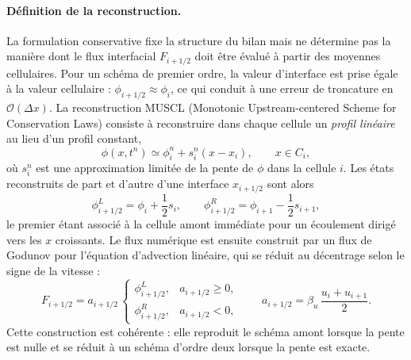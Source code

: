 \documentclass[11pt,a4paper]{report}
\begin{document}
\paragraph{Définition de la reconstruction.} La formulation conservative fixe la structure du bilan mais ne
détermine pas la manière dont le flux interfacial \(F_{i+1/2}\) doit être évalué à partir des moyennes
cellulaires. Pour un schéma de premier ordre, la valeur d'interface est prise égale à la valeur cellulaire :
\(\phi_{i+1/2} \approx \phi_i\), ce qui conduit à une erreur de troncature en \(\mathcal{O}(\Delta x)\).
La reconstruction MUSCL (Monotonic Upstream-centered Scheme for Conservation Laws) consiste à reconstruire
dans chaque cellule un \emph{profil linéaire} au lieu d'un profil constant,
\begin{equation}
\phi(x,t^n) \simeq \phi_i^n + s_i^n\left(x - x_i\right),
\qquad x \in C_i ,
\label{eq:reconstruction-lineaire}
\end{equation}
où \(s_i^n\) est une approximation limitée de la pente de \(\phi\) dans la cellule \(i\). Les états
reconstruits de part et d'autre d'une interface \(x_{i+1/2}\) sont alors
\begin{equation}
\phi_{i+1/2}^{L} = \phi_i + \frac{1}{2}s_i,
\qquad
\phi_{i+1/2}^{R} = \phi_{i+1} - \frac{1}{2}s_{i+1},
\label{eq:etats-interface}
\end{equation}
le premier étant associé à la cellule amont immédiate pour un écoulement dirigé vers les \(x\) croissants.
Le flux numérique est ensuite construit par un flux de Godunov pour l'équation d'advection linéaire, qui
se réduit au décentrage selon le signe de la vitesse :
\begin{equation}
F_{i+1/2} = a_{i+1/2}\,
\begin{cases}
\phi_{i+1/2}^{L}, & a_{i+1/2} \ge 0,\\[1mm]
\phi_{i+1/2}^{R}, & a_{i+1/2} < 0,
\end{cases}
\qquad
a_{i+1/2} = \beta_u\,\frac{u_i + u_{i+1}}{2}.
\label{eq:flux-godunov}
\end{equation}
Cette construction est cohérente : elle reproduit le schéma amont lorsque la pente est nulle et se réduit à
un schéma d'ordre deux lorsque la pente est exacte.
\end{document}
